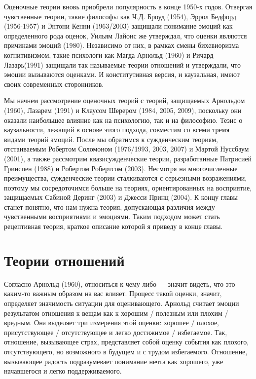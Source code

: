 \documentclass[11pt]{book}
\begin{document}
Оценочные теории вновь приобрели популярность в конце 1950-х годов. Отвергая чувственные теории, такие философы как Ч.Д. Броуд (1954), Эррол Бедфорд (1956-1957) и Энтони Кенни (1963/2003) защищали понимание эмоций как определенного рода оценок, Уильям Лайонс же утверждал, что оценки являются причинами эмоций (1980). Независимо от них, в рамках смены бихевиоризма когнитивизмом, такие психологи как Магда Арнольд (1960) и Ричард Лазарь(1991) защищали так называемые теории отношений и утверждали, что эмоции вызываются оценками. И конститутивная версия, и каузальная, имеют своих современных сторонников.

Мы начнем рассмотрение оценочных теорий с теорий, защищаемых Арнольдом (1960), Лазарем (1991) и Клаусом Шерером (1984, 2005, 2009), поскольку они оказали наибольшее влияние как на психологию, так и на философию. Тезис о каузальности, лежащий в основе этого подхода, совместим со всеми тремя видами теорий эмоций. После мы обратимся к сужденческим теориям, отстаиваемым Робертом Соломоном (1976/1993, 2003, 2007) и Мартой Нуссбаум (2001), а также рассмотрим квазисужденческие теории, разработанные Патрисией Гринспен (1988) и Робертом Робертсом (2003). Несмотря на многочисленные преимущества, сужденческие теории сталкиваются с серьезными возражениями, поэтому мы сосредоточимся больше на теориях, ориентированных на восприятие, защищаемых Сабиной Деринг (2003) и Джесси Принц (2004). К концу главы станет понятно, что нам нужна теория, допускающая различия между чувственными восприятиями и эмоциями. Таким подходом может стать рецептивная теория, краткое описание которой я приведу в конце главы.

\section{Теории отношений}

Согласно Арнольд (1960), относиться к чему-либо --- значит видеть, что это каким-то важным образом на вас влияет. Процесс такой оценки, значит, определяет значимость ситуации для оценивающего. Арнольд считает эмоции результатом отношения к вещам как к хорошим / полезным или плохим / вредным. Она выделяет три измерения этой оценки: хорошее / плохое, присутствующее / отсутствующее и легко достижимое / избегаемое. Так, отношение, вызывающее страх, представляет собой оценку события как плохого, отсутствующего, но возможного в будущем и с трудом избегаемого. Отношение, вызывающее радость подразумевает понимание нечта как хорошего, уже начавшегося и легко поддерживаемого.
\end{document}
